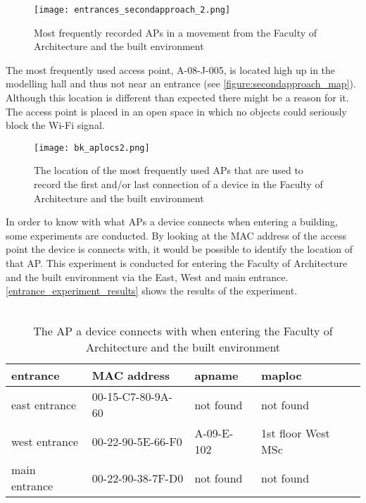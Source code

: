 \begin{figure}[H]
	\centering
	\texttt{[image: entrances\_secondapproach\_2.png]}
	\captionsetup{justification=centering}
	\caption{Most frequently recorded APs in a movement from the Faculty of Architecture and the built environment}
	\label{secondapproach_graph}
\end{figure}
The most frequently used access point, A-08-J-005, is located high up in the modelling hall and thus not near an entrance (see \autoref{figure:secondapproach_map}). Although this location is different than expected there might be a reason for it. The access point is placed in an open space in which no objects could seriously block the Wi-Fi signal.
\begin{figure}[H]
	\centering
	\texttt{[image: bk\_aplocs2.png]}
	\captionsetup{justification=centering}
	\caption{The location of the most frequently used APs that are used to record the first and/or last connection of a device in the Faculty of Architecture and the built environment}
	\label{figure:secondapproach_map}
\end{figure}
In order to know with what APs a device connects when entering a building, some experiments are conducted. By looking at the MAC address of the access point the device is connects with, it would be possible to identify the location of that AP. This experiment is conducted for entering the Faculty of Architecture and the built environment via the East, West and main entrance. \autoref{entrance_experiment_results} shows the results of the experiment.\\\\
\begin{table}[H]
	\centering
	\captionsetup{justification=centering}
	\caption{The AP a device connects with when entering the Faculty of Architecture and the built environment}
	\label{entrance_experiment_results}
	\begin{tabular}{@{}llll@{}}
		\toprule
		\textbf{entrance} & \textbf{MAC address} & \textbf{apname} & \textbf{maploc}    \\ \midrule
		east entrance     & 00-15-C7-80-9A-60    & not found       & not found          \\
		west entrance     & 00-22-90-5E-66-F0    & A-09-E-102      & 1st floor West MSc \\
		main entrance     & 00-22-90-38-7F-D0    & not found       & not found          \\ \bottomrule
	\end{tabular}
\end{table}
